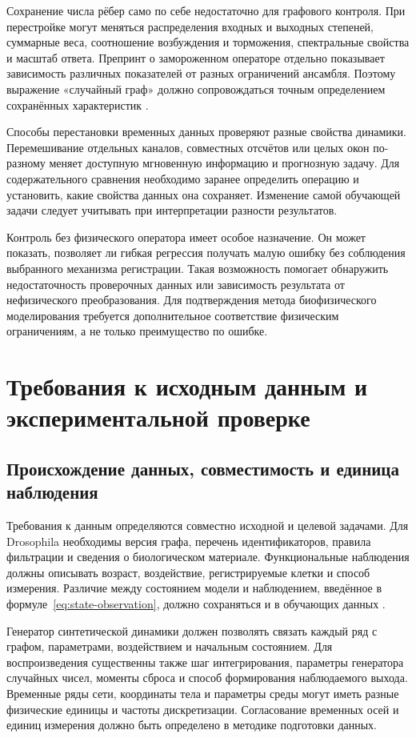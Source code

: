 Сохранение числа рёбер само по себе недостаточно для графового контроля. При перестройке могут меняться распределения входных и выходных степеней, суммарные веса, соотношение возбуждения и торможения, спектральные свойства и масштаб ответа. Препринт о замороженном операторе отдельно показывает зависимость различных показателей от разных ограничений ансамбля. Поэтому выражение «случайный граф» должно сопровождаться точным определением сохранённых характеристик \cite{s854}.

Способы перестановки временных данных проверяют разные свойства динамики. Перемешивание отдельных каналов, совместных отсчётов или целых окон по-разному меняет доступную мгновенную информацию и прогнозную задачу. Для содержательного сравнения необходимо заранее определить операцию и установить, какие свойства данных она сохраняет. Изменение самой обучающей задачи следует учитывать при интерпретации разности результатов.

Контроль без физического оператора имеет особое назначение. Он может показать, позволяет ли гибкая регрессия получать малую ошибку без соблюдения выбранного механизма регистрации. Такая возможность помогает обнаружить недостаточность проверочных данных или зависимость результата от нефизического преобразования. Для подтверждения метода биофизического моделирования требуется дополнительное соответствие физическим ограничениям, а не только преимущество по ошибке.

\section{Требования к исходным данным и экспериментальной проверке}
\label{sec:data-validation}

\subsection{Происхождение данных, совместимость и единица наблюдения}

Требования к данным определяются совместно исходной и целевой задачами. Для Drosophila необходимы версия графа, перечень идентификаторов, правила фильтрации и сведения о биологическом материале. Функциональные наблюдения должны описывать возраст, воздействие, регистрируемые клетки и способ измерения. Различие между состоянием модели и наблюдением, введённое в формуле~\eqref{eq:state-observation}, должно сохраняться и в обучающих данных \cite{s904,s212}.

Генератор синтетической динамики должен позволять связать каждый ряд с графом, параметрами, воздействием и начальным состоянием. Для воспроизведения существенны также шаг интегрирования, параметры генератора случайных чисел, моменты сброса и способ формирования наблюдаемого выхода. Временные ряды сети, координаты тела и параметры среды могут иметь разные физические единицы и частоты дискретизации. Согласование временных осей и единиц измерения должно быть определено в методике подготовки данных.

